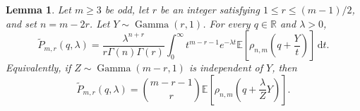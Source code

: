 \documentclass[11pt]{article}
\newtheorem{lemma}[theorem]{Lemma}
\theoremstyle{remark}
\numberwithin{equation}{section}
\newcommand{\R}{\mathbb R}
\newcommand{\dd}{\,\mathrm d}
\newcommand{\E}{\mathbb E}
\newcommand{\GammaLaw}{\operatorname{Gamma}}
\begin{document}
\begin{lemma}\label{lem:pge23-laplace-gamma}
  Let $m\ge3$ be odd, let $r$ be an integer satisfying
  $1\le r\le(m-1)/2$, and set $n=m-2r$.
  Let $Y\sim\GammaLaw(r,1)$.
  For every $q\in\R$ and $\lambda>0$,
  \begin{equation}\label{eq:pge23-laplace-gamma}
    \widetilde P_{m,r}(q,\lambda)
    =\frac{\lambda^{n+r}}{r\Gamma(n)\Gamma(r)}
    \int_0^\infty
    t^{m-r-1}e^{-\lambda t}
    \E\left[\rho_{n,m}\left(q+\frac {Y}{t}\right)\right]\dd t.
  \end{equation}
  Equivalently, if $Z\sim\GammaLaw(m-r,1)$ is independent of $Y$, then
  \begin{equation}\label{eq:pge23-gamma-expectation}
    \widetilde P_{m,r}(q,\lambda)
    =\binom{m-r-1}{r}
      \E\!\left[\rho_{n,m}\!\left(q+\frac{\lambda}{Z}Y\right)\right].
  \end{equation}
\end{lemma}
\end{document}
